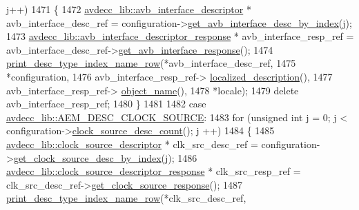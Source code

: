 \begin{DoxyCode}
       j++)
1471             \{
1472                 \hyperlink{classavdecc__lib_1_1avb__interface__descriptor}{avdecc\_lib::avb\_interface\_descriptor} * 
      avb\_interface\_desc\_ref = configuration->\hyperlink{classavdecc__lib_1_1configuration__descriptor_a177c390ccb74a31750b8eb0feb406144}{get\_avb\_interface\_desc\_by\_index}(j);
1473                 \hyperlink{classavdecc__lib_1_1avb__interface__descriptor__response}{avdecc\_lib::avb\_interface\_descriptor\_response} 
      * avb\_interface\_resp\_ref = avb\_interface\_desc\_ref->\hyperlink{classavdecc__lib_1_1avb__interface__descriptor_a1390fe74fc65f7cabb73c64ba1770318}{get\_avb\_interface\_response}();
1474                 \hyperlink{classcmd__line_ac47c21c03b69593b74e7c43201d0ba41}{print\_desc\_type\_index\_name\_row}(*avb\_interface\_desc\_ref,
1475                                                *configuration,
1476                                                avb\_interface\_resp\_ref->
      \hyperlink{classavdecc__lib_1_1avb__interface__descriptor__response_a1fb9de45567df344090a1407aa6b775f}{localized\_description}(),
1477                                                avb\_interface\_resp\_ref->
      \hyperlink{classavdecc__lib_1_1descriptor__response__base_a133f7774946d80f82b8aaaa4cfbb7361}{object\_name}(),
1478                                                *locale);
1479                 \textcolor{keyword}{delete} avb\_interface\_resp\_ref;
1480             \}
1481 
1482         \textcolor{keywordflow}{case} \hyperlink{namespaceavdecc__lib_ac7b7d227e46bc72b63ee9e9aae15902faad2bbd7b33d8d136ac379369c1d77091}{avdecc\_lib::AEM\_DESC\_CLOCK\_SOURCE}:
1483             \textcolor{keywordflow}{for} (\textcolor{keywordtype}{unsigned} \textcolor{keywordtype}{int} j = 0; j < configuration->\hyperlink{classavdecc__lib_1_1configuration__descriptor_a705df684f456b2c082d52c563125e853}{clock\_source\_desc\_count}(); j
      ++)
1484             \{
1485                 \hyperlink{classavdecc__lib_1_1clock__source__descriptor}{avdecc\_lib::clock\_source\_descriptor} * clk\_src\_desc\_ref =
       configuration->\hyperlink{classavdecc__lib_1_1configuration__descriptor_aefc07c368de7626396dbf6d6605f1b48}{get\_clock\_source\_desc\_by\_index}(j);
1486                 \hyperlink{classavdecc__lib_1_1clock__source__descriptor__response}{avdecc\_lib::clock\_source\_descriptor\_response} * 
      clk\_src\_resp\_ref = clk\_src\_desc\_ref->\hyperlink{classavdecc__lib_1_1clock__source__descriptor_abeab06c506fbd0127358623bfd189787}{get\_clock\_source\_response}();
1487                 \hyperlink{classcmd__line_ac47c21c03b69593b74e7c43201d0ba41}{print\_desc\_type\_index\_name\_row}(*clk\_src\_desc\_ref,

\end{DoxyCode}
